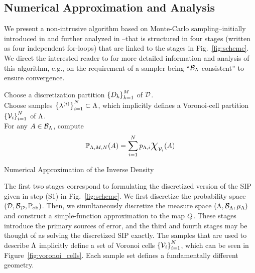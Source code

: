 \subsection{Numerical Approximation and Analysis}\label{sec:set-algorithm}
We present a non-intrusive algorithm based on Monte-Carlo sampling\---initially introduced in \cite{BET+14} and further analyzed in \cite{BET+14-arxiv}\---that is structured in four stages (written as four independent for-loops) that are linked to the stages in Fig.~\ref{fig:scheme}.
We direct the interested reader to \cite{BET+14-arxiv} for more detailed information and analysis of this algorithm, e.g., on the requirement of a sampler being ``$\mathcal{B}_{{\Lambda}}$-consistent'' to ensure convergence.


\begin{algorithm}[hbtp]
\DontPrintSemicolon
Choose a discretization partition $\left\{D_k\right\}_{k=1}^{M}$ of $\mathcal{D}$.\\
	Choose samples $\left\{\lambda^{(i)}\right\}_{i=1}^{N} \subset {\Lambda}$, which implicitly defines a Voronoi-cell partition $\left\{\mathcal{V}_i\right\}_{i=1}^{N}$ of ${\Lambda}$.\\
	For any $A\in \mathcal{B}_{{\Lambda}}$, compute
	\begin{equation}
	\PP_{\pspace, \ndiscs, \nsamps} (A) = \sum_{\iparam=1}^\nsamps p_{\pspace, \iparam} \Chi_{\VV_\iparam} (A)
	\end{equation}
 \caption{Numerical Approximation of the Inverse Density}
 \label{alg:inv_density}
\end{algorithm}


The first two stages correspond to formulating the discretized version of the SIP given in step (S1) in Fig.~\ref{fig:scheme}.
We first discretize the probability space $(\mathcal{D}, \mathcal{B}_{\mathcal{D}}, \operatorname*{\mathbb{P}_{ob}})$.
Then, we simultaneously discretize the measure space $({\Lambda}, \mathcal{B}_{{\Lambda}}, \mu_{{\Lambda}})$ and construct a simple-function approximation to the map $Q$.
These stages introduce the primary sources of error, and the third and fourth stages may be thought of as solving the discretized SIP exactly.
The samples that are used to describe ${\Lambda}$ implicitly define a set of Voronoi cells $\left\{\mathcal{V}_i\right\}_{i=1}^{N}$, which can be seen in Figure~\ref{fig:voronoi_cells}.
Each sample set defines a fundamentally different geometry.

